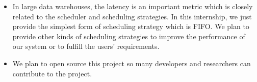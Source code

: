 \begin{itemize}
\item In large data warehouses, the latency is an important metric which is closely related to the scheduler and scheduling strategies. In this internship, we just provide the simplest form of scheduling strategy which is FIFO. We plan to provide other kinds of scheduling strategies to improve the performance of our system or to fulfill the users' requirements.

\item We plan to open source this project so many developers and researchers can contribute to the project.
\end{itemize}
